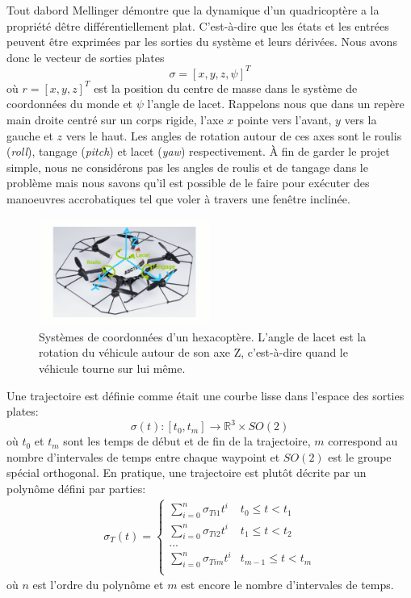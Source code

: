 Tout dabord Mellinger démontre que la dynamique d'un quadricoptère a la propriété dêtre différentiellement plat. C'est-à-dire que les états et les entrées peuvent être exprimées par les sorties du système et leurs dérivées. Nous avons donc le vecteur de sorties plates
$$\sigma = [x, y, z, \psi]^T$$
où $r = [x, y, z]^T$ est la position du centre de masse dans le système de coordonnées du monde et $\psi$ l'angle de lacet. Rappelons nous que dans un repère main droite centré sur un corps rigide, l'axe $x$ pointe vers l'avant, $y$ vers la gauche et $z$ vers le haut. Les angles de rotation autour de ces axes sont le roulis (\textit{roll}), tangage (\textit{pitch}) et lacet (\textit{yaw}) respectivement. À fin de garder le projet simple, nous ne considérons pas les angles de roulis et de tangage dans le problème mais nous savons qu'il est possible de le faire pour exécuter des manoeuvres accrobatiques tel que voler à travers une fenêtre inclinée.

\begin{figure}[h]
	\centering
	\includegraphics[width=0.5\textwidth]{fig/firefly.png}
	\caption{Systèmes de coordonnées d'un hexacoptère. L'angle de lacet est la rotation du véhicule autour de son axe Z, c'est-à-dire quand le véhicule tourne sur lui même.}
\end{figure}

Une trajectoire est définie comme était une courbe lisse dans l'espace des sorties plates:
$$ \sigma(t) : [t_0, t_m] \rightarrow \mathbb{R}^3 \times SO(2)$$
où $t_0$ et $t_m$ sont les temps de début et de fin de la trajectoire, $m$ correspond au nombre d'intervales de temps entre chaque waypoint et $SO(2)$ est le groupe spécial orthogonal. En pratique, une trajectoire est plutôt décrite par un polynôme défini par parties:
\begin{align}\label{eq:polynomial}
\sigma_T(t) =
\left\{
	\begin{array}{ll}
		\sum_{i=0}^n \sigma_{Ti1} t^i  & t_0 \leq t < t_1 \\
		\sum_{i=0}^n \sigma_{Ti2} t^i  & t_1 \leq t < t_2 \\
		... \\
		\sum_{i=0}^n \sigma_{Tim} t^i  & t_{m-1} \leq t < t_m \\
	\end{array}
\right.
\end{align}
où $n$ est l'ordre du polynôme et $m$ est encore le nombre d'intervales de temps.

